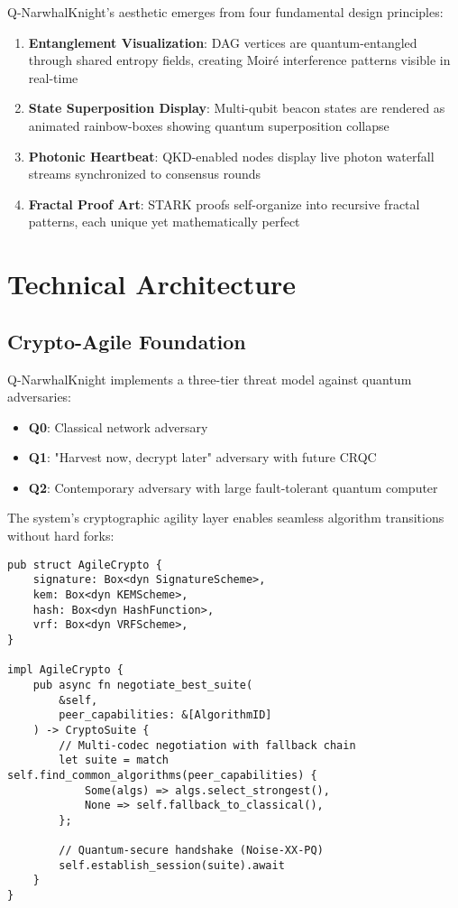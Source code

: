 \documentclass[12pt,a4paper]{article}
\begin{document}
Q-NarwhalKnight's aesthetic emerges from four fundamental design principles:

\begin{enumerate}
\item \textbf{Entanglement Visualization}: DAG vertices are quantum-entangled through shared entropy fields, creating Moiré interference patterns visible in real-time
\item \textbf{State Superposition Display}: Multi-qubit beacon states are rendered as animated rainbow-boxes showing quantum superposition collapse
\item \textbf{Photonic Heartbeat}: QKD-enabled nodes display live photon waterfall streams synchronized to consensus rounds
\item \textbf{Fractal Proof Art}: STARK proofs self-organize into recursive fractal patterns, each unique yet mathematically perfect
\end{enumerate}

\section{Technical Architecture}

\subsection{Crypto-Agile Foundation}

Q-NarwhalKnight implements a three-tier threat model against quantum adversaries:

\begin{itemize}
\item \textbf{Q0}: Classical network adversary
\item \textbf{Q1}: "Harvest now, decrypt later" adversary with future CRQC
\item \textbf{Q2}: Contemporary adversary with large fault-tolerant quantum computer
\end{itemize}

The system's cryptographic agility layer enables seamless algorithm transitions without hard forks:

\begin{lstlisting}[caption=Cryptographic Agility Implementation]
pub struct AgileCrypto {
    signature: Box<dyn SignatureScheme>,
    kem: Box<dyn KEMScheme>,
    hash: Box<dyn HashFunction>,
    vrf: Box<dyn VRFScheme>,
}

impl AgileCrypto {
    pub async fn negotiate_best_suite(
        &self, 
        peer_capabilities: &[AlgorithmID]
    ) -> CryptoSuite {
        // Multi-codec negotiation with fallback chain
        let suite = match self.find_common_algorithms(peer_capabilities) {
            Some(algs) => algs.select_strongest(),
            None => self.fallback_to_classical(),
        };
        
        // Quantum-secure handshake (Noise-XX-PQ)
        self.establish_session(suite).await
    }
}
\end{lstlisting}
\end{document}
